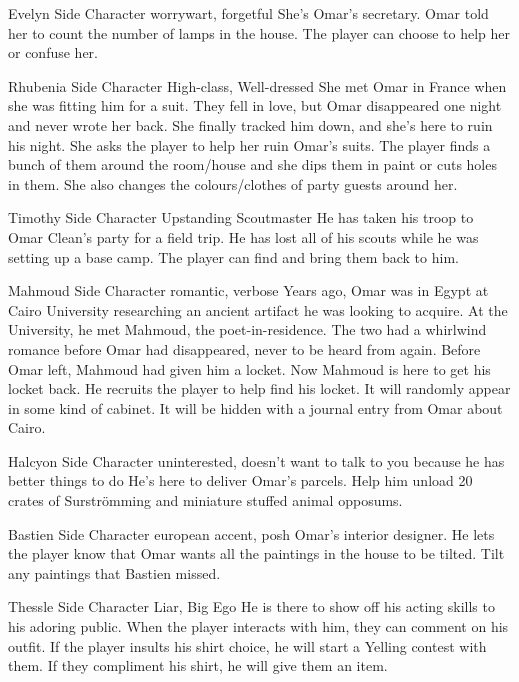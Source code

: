 {Evelyn}
{Side Character}
{worrywart, forgetful}
{She's Omar's secretary.}
{Omar told her to count the number of lamps in the house. The player can choose to help her or confuse her.}

{Rhubenia}
{Side Character}
{High-class, Well-dressed}
{She met Omar in France when she was fitting him for a suit. They fell in love, but Omar disappeared one night and never wrote her back. She finally tracked him down, and she's here to ruin his night.}
{She asks the player to help her ruin Omar's suits. The player finds a bunch of them around the room/house and she dips them in paint or cuts holes in them. She also changes the colours/clothes of party guests around her.}

{Timothy}
{Side Character}
{Upstanding Scoutmaster}
{He has taken his troop to Omar Clean's party for a field trip.}
{He has lost all of his scouts while he was setting up a base camp. The player can find and bring them back to him.}

{Mahmoud}
{Side Character}
{romantic, verbose}
{Years ago, Omar was in Egypt at Cairo University researching an ancient artifact he was looking to acquire. At the University, he met Mahmoud, the poet-in-residence. The two had a whirlwind romance before Omar had disappeared, never to be heard from again. Before Omar left, Mahmoud had given him a locket. Now Mahmoud is here to get his locket back.}
{He recruits the player to help find his locket. It will randomly appear in some kind of cabinet. It will be hidden with a journal entry from Omar about Cairo.}

{Halcyon}
{Side Character}
{uninterested, doesn't want to talk to you because he has better things to do}
{He's here to deliver Omar's parcels.}
{Help him unload 20 crates of Surströmming and miniature stuffed animal opposums.}

{Bastien}
{Side Character}
{european accent, posh}
{Omar's interior designer.}
{He lets the player know that Omar wants all the paintings in the house to be tilted. Tilt any paintings that Bastien missed.}

{Thessle}
{Side Character}
{Liar, Big Ego}
{He is there to show off his acting skills to his adoring public.}
{When the player interacts with him, they can comment on his outfit. If the player insults his shirt choice, he will start a Yelling contest with them. If they compliment his shirt, he will give them an item.}